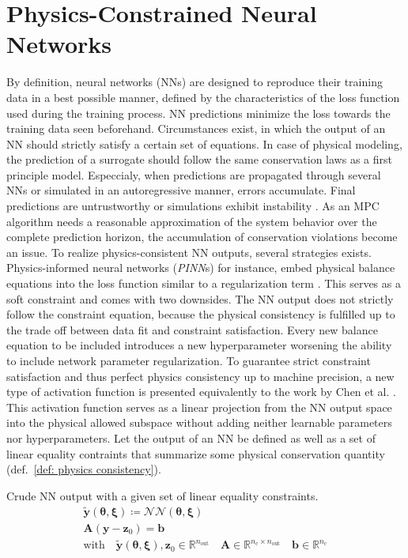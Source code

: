 \section{Physics-Constrained Neural Networks}
By definition, neural networks (NNs) are designed to reproduce their training data in a best possible manner,
defined by the characteristics of the loss
function used during the training process. NN predictions minimize the loss towards the training data seen beforehand.
Circumstances exist, in which the output of an NN should strictly satisfy a certain set of equations. In case of
physical modeling, the prediction of a surrogate should follow the same conservation laws as a first principle model. Especcialy,
when predictions are propagated through several NNs or simulated in an autoregressive manner, errors accumulate. 
Final predictions are untrustworthy or simulations exhibit instability \cite{chen2024}. As an MPC algorithm needs a reasonable
approximation of the system behavior over the complete prediction horizon, the accumulation of conservation violations
become an issue.
\newline
\newline
\noindent
To realize physics-consistent NN outputs, several strategies exists. Physics-informed neural networks (\emph{PINN}s) for instance,
embed physical balance equations into the loss function similar to a regularization term \cite{raissi2019}. This serves as a 
soft constraint and comes with two downsides.
The NN output does not strictly follow the constraint equation, because the physical consistency is fulfilled up to
the trade off between data fit and constraint satisfaction.
Every new balance equation to be included introduces a new hyperparameter worsening the ability to include network parameter regularization.
To guarantee strict constraint satisfaction and thus perfect physics consistency up to machine precision,
a new type of activation function is presented equivalently to the work by Chen et al. \cite{chen2024}. This activation function serves as a linear projection from the NN output space
into the physical allowed subspace without adding neither learnable parameters nor hyperparameters.
Let the output of an NN be defined as well as a set of linear equality contraints that summarize some physical conservation quantity (def.~\ref{def: physics consistency}).


\begin{definition} Crude NN output with a given set of linear equality constraints.
    \label{def: physics consistency}
    \[
        \begin{gathered}
        \bm{\tilde{y}}(\bm{\theta}, \bm{\xi}) \coloneq \mathcal{NN}(\bm{\theta}, \bm{\xi})
        \\
        \bm{A} (\bm{y} - \bm{z}_0) = \bm{b}
        \\
        \text{with}
        \quad
        \bm{\tilde{y}}(\bm{\theta}, \bm{\xi}), \bm{z}_0 \in \mathbb{R}^{n_\text{out}}
        \quad
        \bm{A} \in \mathbb{R}^{n_\text{c} \times n_\text{out}}
        \quad
        \bm{b} \in \mathbb{R}^{n_{\text{c}}}
        \end{gathered}
    \]
\end{definition}


